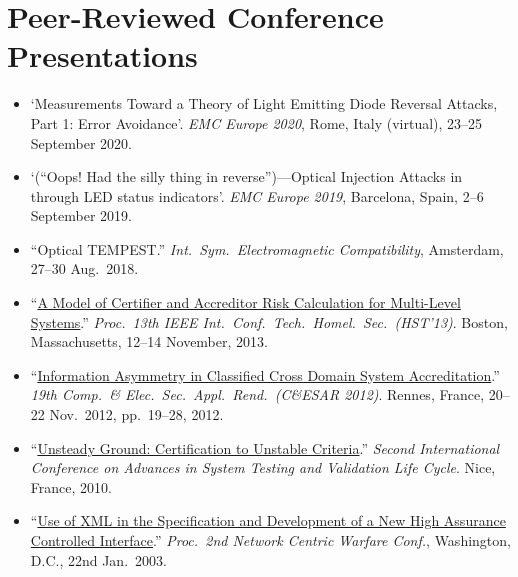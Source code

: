 \section*{Peer-Reviewed Conference Presentations}
\vspace{-3mm}

\begin{itemize}
  \item `Measurements Toward a Theory of Light Emitting Diode Reversal Attacks,
  Part 1: Error Avoidance'. \emph{EMC Europe 2020}, Rome, Italy (virtual),
  23--25 September 2020.\vspace{-2.5mm}

  \item `(``Oops! Had the silly thing in reverse'')---Optical Injection
  Attacks in through LED status indicators'.
  \emph{EMC Europe 2019}, Barcelona, Spain, 2--6 September 2019.\vspace{-2.5mm}

  \item ``Optical TEMPEST.'' \emph{Int.\ Sym.\ Electromagnetic Compatibility},
    Amsterdam, 27--30 Aug.\ 2018.\vspace{-2.5mm}

	\item ``\href{http://ieeexplore.ieee.org/xpls/abs_all.jsp?arnumber=6699004}%
{A Model of Certifier and Accreditor Risk Calculation for Multi-Level
Systems}.'' \emph{Proc.\ 13th IEEE Int.\ Conf.\ Tech.\ Homel.\ Sec.\ (HST'13)}.
Boston, Massachusetts, 12--14 November, 2013.\vspace{-2.5mm}

	\item
``\href{http://cnadocs.com/papers/CESAR2012_information_asymmetry.pdf}%
{Information Asymmetry in Classified Cross Domain System Accreditation}.''
\emph{19th Comp.\ \& Elec.\ Sec.\ Appl.\ Rend.\ (C\&ESAR 2012)}. Rennes,
France, 20--22 Nov.\ 2012, pp.\ 19--28, 2012.\vspace{-2.5mm}

	\item
``\href{http://ieeexplore.ieee.org/xpl/articleDetails.jsp?arnumber=5617171}%
{Unsteady Ground: Certification to Unstable Criteria}.'' \emph{Second
International Conference on Advances in System Testing and Validation Life
Cycle}. Nice, France, 2010.\vspace{-2.5mm}


	\item ``\href{http://cnadocs.com/papers/xml_paper.pdf}%
{Use of XML in the Specification and Development of a New High Assurance
Controlled Interface}.'' \emph{Proc.\ 2nd Network Centric Warfare Conf.},
Washington, D.C., 22nd Jan.\ 2003.
\end{itemize}

